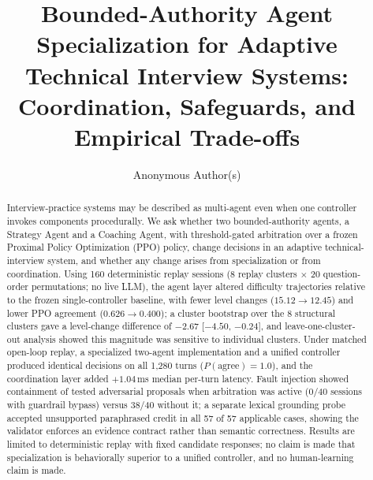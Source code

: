 \documentclass[runningheads]{llncs}
\begin{document}
\title{Bounded-Authority Agent Specialization for Adaptive Technical Interview Systems: Coordination, Safeguards, and Empirical Trade-offs}

\author{Anonymous Author(s)}

\maketitle

\begin{abstract}
Interview-practice systems may be described as multi-agent even when one controller invokes components procedurally. We ask whether two bounded-authority agents, a Strategy Agent and a Coaching Agent, with threshold-gated arbitration over a frozen Proximal Policy Optimization (PPO) policy, change decisions in an adaptive technical-interview system, and whether any change arises from specialization or from coordination. Using 160 deterministic replay sessions (8 replay clusters $\times$ 20 question-order permutations; no live LLM), the agent layer altered difficulty trajectories relative to the frozen single-controller baseline, with fewer level changes ($15.12 \rightarrow 12.45$) and lower PPO agreement ($0.626 \rightarrow 0.400$); a cluster bootstrap over the 8 structural clusters gave a level-change difference of $-2.67$ [$-4.50$, $-0.24$], and leave-one-cluster-out analysis showed this magnitude was sensitive to individual clusters. Under matched open-loop replay, a specialized two-agent implementation and a unified controller produced identical decisions on all 1,280 turns ($P(\mathrm{agree}) = 1.0$), and the coordination layer added $+1.04$\,ms median per-turn latency. Fault injection showed containment of tested adversarial proposals when arbitration was active (0/40 sessions with guardrail bypass) versus 38/40 without it; a separate lexical grounding probe accepted unsupported paraphrased credit in all 57 of 57 applicable cases, showing the validator enforces an evidence contract rather than semantic correctness. Results are limited to deterministic replay with fixed candidate responses; no claim is made that specialization is behaviorally superior to a unified controller, and no human-learning claim is made.

\end{abstract}
\end{document}
